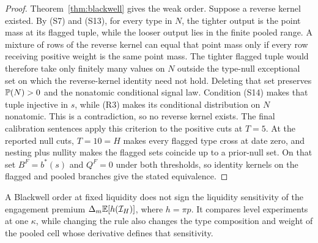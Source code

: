 \begin{proof}
Theorem~\ref{thm:blackwell} gives the weak order. Suppose a reverse kernel existed. By (S7) and
(S13), for every type in $N$, the tighter output is the point mass at its flagged tuple, while the
looser output lies in
the finite pooled range. A mixture of rows of the reverse kernel can equal that point mass only if
every row receiving positive weight is the same point mass. The tighter flagged tuple would
therefore take only finitely many values on $N$ outside the type-null exceptional set on which the
reverse-kernel identity need not hold. Deleting that set preserves $\mathbb{P}(N)>0$ and the nonatomic
conditional signal law. Condition (S14) makes that tuple
injective in $s$, while (R3) makes its conditional distribution on $N$ nonatomic. This is a
contradiction, so no reverse kernel exists. The final calibration sentences apply this criterion to
the positive cuts at $T=5$. At the reported null cuts, $T=10=H$ makes every flagged type cross at
date zero, and nesting plus nullity makes the flagged sets coincide up to a prior-null set. On that
set $B^F=b^*(s)$ and $Q^F=0$ under both thresholds, so identity kernels on the flagged and pooled
branches give the stated equivalence.
\end{proof}

\begin{remark}
A Blackwell order at fixed liquidity does not sign the liquidity sensitivity of the engagement
premium $\Delta_m\mathbb{E}[h(\mathcal I_H)]$, where $h=\pi p$. It compares level experiments at one
$\kappa$, while changing the rule also changes the type composition and weight of the pooled cell
whose derivative defines that sensitivity.
\end{remark}
